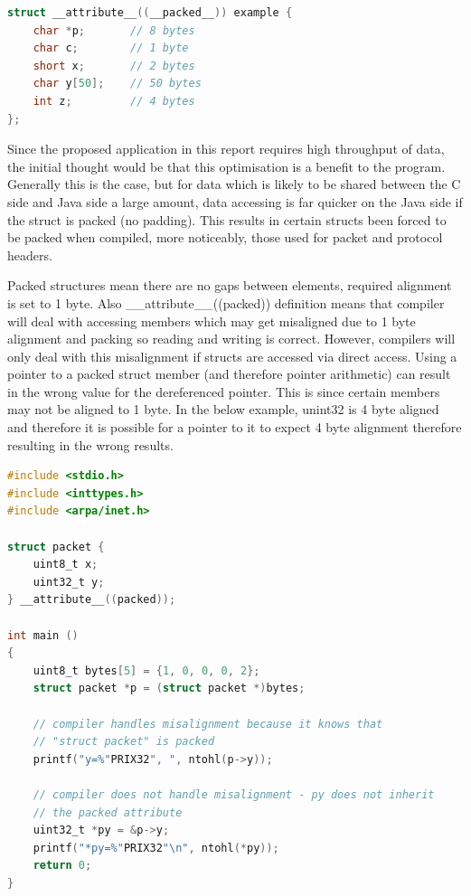 \documentclass[final_report.tex]{subfiles}
\begin{document}
\begin{lstlisting}[language=C, caption={Example C Struct stopping padding}, label=lst:c_packed_struct]
struct __attribute__((__packed__)) example {
    char *p;       // 8 bytes
    char c;        // 1 byte
    short x;       // 2 bytes
    char y[50];    // 50 bytes
    int z;         // 4 bytes
};
\end{lstlisting}

Since the proposed application in this report requires high throughput of data, the initial thought would be that this optimisation is a benefit to the program. Generally this is the case, but for data which is likely to be shared between the C side and Java side a large amount, data accessing is far quicker  on the Java side if the struct is packed (no padding). This results in certain structs been forced to be packed when compiled, more noticeably, those used for packet and protocol headers.

Packed structures mean there are no gaps between elements, required alignment is set to 1 byte. Also \_\_attribute\_\_((packed)) definition means that compiler will deal with accessing members which may get misaligned due to 1 byte alignment and packing so reading and writing is correct. However, compilers will only deal with this misalignment if structs are accessed via direct access. Using a pointer to a packed struct member (and therefore pointer arithmetic) can result in the wrong value for the dereferenced pointer. This is since certain members may not be aligned to 1 byte. In the below example, unint32 is 4 byte aligned and therefore it is possible for a pointer to it to expect 4 byte alignment therefore resulting in the wrong results.

\begin{lstlisting}[language=C, caption={Example C Struct with compiler inserted padding}, label=lst:c_padded_struct]
#include <stdio.h>
#include <inttypes.h>
#include <arpa/inet.h>

struct packet {
    uint8_t x;
    uint32_t y;
} __attribute__((packed));

int main ()
{
    uint8_t bytes[5] = {1, 0, 0, 0, 2};
    struct packet *p = (struct packet *)bytes;

    // compiler handles misalignment because it knows that
    // "struct packet" is packed
    printf("y=%"PRIX32", ", ntohl(p->y));

    // compiler does not handle misalignment - py does not inherit
    // the packed attribute
    uint32_t *py = &p->y;
    printf("*py=%"PRIX32"\n", ntohl(*py));
    return 0;
}
\end{lstlisting}
\end{document}
